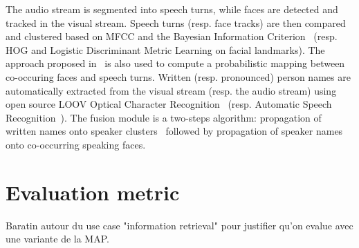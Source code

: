 \documentclass{acm_proc_article-me}
\begin{document}
The audio stream is segmented into speech turns, while faces are detected and tracked in the visual stream.
Speech turns (resp. face tracks) are then compared and clustered based on MFCC and the Bayesian Information Criterion~\cite{CHEN--DARPA--1998} (resp. HOG\cite{DALAL--CVPR--2005} and Logistic Discriminant Metric Learning\cite{GUILLAUMIN--JCV--2012} on facial landmarks\cite{URICAR--VISAPP--2012}). The approach proposed in~\cite{POIGNANT--MTAP--2015} is also used to compute a probabilistic mapping between co-occuring faces and speech turns. Written (resp. pronounced) person names are automatically extracted from the visual stream (resp. the audio stream) using open source LOOV Optical Character Recognition~\cite{POIGNANT--ICME--2012} (resp. Automatic Speech Recognition~\cite{LAMEL--IWSLT--2011, DIANRELLI--IJCNLP--2011}). The fusion module is a two-steps algorithm: propagation of written names onto speaker clusters~\cite{POIGNANT--INTERSPEECH--2012} followed by propagation of speaker names onto co-occurring speaking faces.

\section{Evaluation metric}
\label{sec:metric}

Baratin autour du use case "information retrieval" pour justifier qu'on evalue
avec une variante de la MAP.
\end{document}
